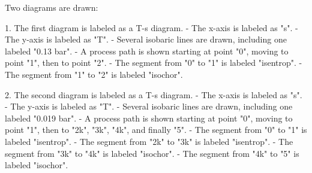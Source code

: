 Two diagrams are drawn:  

1. The first diagram is labeled as a T-s diagram.  
   - The x-axis is labeled as "s".  
   - The y-axis is labeled as "T".  
   - Several isobaric lines are drawn, including one labeled "0.13 bar".  
   - A process path is shown starting at point "0", moving to point "1", then to point "2".  
   - The segment from "0" to "1" is labeled "isentrop".  
   - The segment from "1" to "2" is labeled "isochor".  

2. The second diagram is labeled as a T-s diagram.  
   - The x-axis is labeled as "s".  
   - The y-axis is labeled as "T".  
   - Several isobaric lines are drawn, including one labeled "0.019 bar".  
   - A process path is shown starting at point "0", moving to point "1", then to "2k", "3k", "4k", and finally "5".  
   - The segment from "0" to "1" is labeled "isentrop".  
   - The segment from "2k" to "3k" is labeled "isentrop".  
   - The segment from "3k" to "4k" is labeled "isochor".  
   - The segment from "4k" to "5" is labeled "isochor".